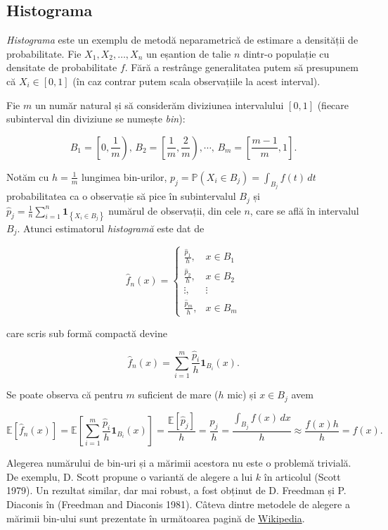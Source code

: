\documentclass[]{article}
\begin{document}
\subsection{Histograma}\label{histograma}

\emph{Histograma} este un exemplu de metodă neparametrică de estimare a
densității de probabilitate. Fie \(X_1, X_2, \ldots, X_n\) un eșantion
de talie \(n\) dintr-o populație cu densitate de probabilitate \(f\).
Fără a restrânge generalitatea putem să presupunem că \(X_i\in[0,1]\)
(în caz contrar putem scala observațiile la acest interval).

Fie \(m\) un număr natural și să considerăm diviziunea intervalului
\([0,1]\) (fiecare subinterval din diviziune se numește \emph{bin}):

\[
  B_1 = \left[0, \frac{1}{m}\right), \, B_2 = \left[\frac{1}{m}, \frac{2}{m}\right),\cdots,\, B_m = \left[\frac{m-1}{m}, 1\right].
\]

Notăm cu \(h = \frac{1}{m}\) lungimea bin-urilor,
\(p_j = \mathbb{P}(X_i\in B_j) = \int_{B_j}f(t)\,dt\) probabilitatea ca
o observație să pice în subintervalul \(B_j\) și
\(\hat{p}_j = \frac{1}{n}\sum_{i = 1}^{n}\mathbf{1}_{\left\{X_i \in B_j\right\}}\)
numărul de observații, din cele \(n\), care se află în intervalul
\(B_j\). Atunci estimatorul \emph{histogramă} este dat de

\[
  \hat{f}_n(x) = \left\{\begin{array}{llll}
            \frac{\hat{p}_1}{h}, & x\in B_1\\
            \frac{\hat{p}_2}{h}, & x\in B_2\\
            \vdots, & \vdots\\
            \frac{\hat{p}_m}{h}, & x\in B_m
  \end{array}\right.
\]

care scris sub formă compactă devine

\[
  \hat{f}_n(x) = \sum_{i=1}^{m} \frac{\hat{p}_i}{h} \mathbf{1}_{B_i}(x).
\]

Se poate observa că pentru \(m\) suficient de mare (\(h\) mic) și
\(x\in B_j\) avem

\[
  \mathbb{E}\left[\hat{f}_n(x)\right] = \mathbb{E}\left[\sum_{i=1}^{m} \frac{\hat{p}_i}{h} \mathbf{1}_{B_i}(x)\right]= \frac{\mathbb{E}\left[\hat{p}_j\right]}{h} = \frac{p_j}{h} = \frac{\int_{B_j}f(x)\,dx}{h}\approx \frac{f(x)h}{h} = f(x).
\]

Alegerea numărului de bin-uri și a mărimii acestora nu este o problemă
trivială. De exemplu, D. Scott propune o variantă de alegere a lui \(k\)
în articolul (Scott 1979). Un rezultat similar, dar mai robust, a fost
obținut de D. Freedman și P. Diaconis în (Freedman and Diaconis 1981).
Câteva dintre metodele de alegere a mărimii bin-ului sunt prezentate în
următoarea pagină de
\href{https://en.wikipedia.org/wiki/Histogram\#Number_of_bins_and_width}{Wikipedia}.
\end{document}
